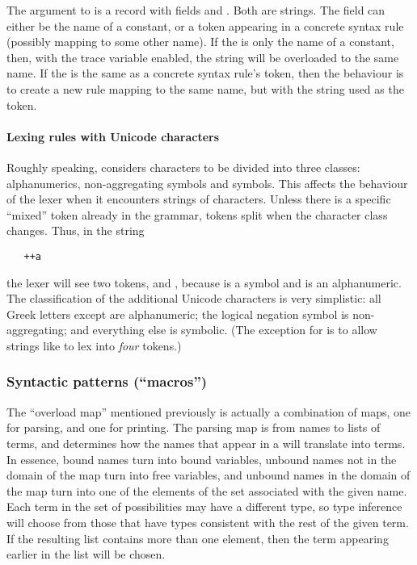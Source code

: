 The argument to  is a record with fields 
and .  Both are strings.  The  field can either be
the name of a constant, or a token appearing in a concrete syntax rule
(possibly mapping to some other name).  If the  is only the
name of a constant, then, with the trace variable enabled, the string
 will be overloaded to the same name.  If the  is the
same as a concrete syntax rule's token, then the behaviour is to
create a new rule mapping to the same name, but with the string 
used as the token.

\paragraph{Lexing rules with Unicode characters}
%
%
Roughly speaking, \HOL{} considers characters to be divided into three
classes: alphanumerics, non-aggregating symbols and symbols.  This
affects the behaviour of the lexer when it encounters strings of
characters.  Unless there is a specific ``mixed'' token already in the
grammar, tokens split when the character class changes.  Thus, in the
string
\begin{verbatim}
   ++a
\end{verbatim}
the lexer will see two tokens, \holtxt{++} and , because
\holtxt{+} is a symbol and  is an alphanumeric.  The
classification of the additional Unicode characters is very
simplistic: all Greek letters except \holtxt{$\lambda$} are alphanumeric;
the logical negation symbol \holtxt{$\neg$} is non-aggregating; and
everything else is symbolic.  (The exception for \holtxt{$\lambda$} is to
allow strings like  to lex into \emph{four} tokens.)


\subsubsection{Syntactic patterns (``macros'')}
\label{sec:parser:syntactic-patterns}

The ``overload map'' mentioned previously is actually a combination of
maps, one for parsing, and one for printing.  The parsing map is from
names to lists of terms, and determines how the names that appear in a
 will translate into terms.  In essence, bound names turn
into bound variables, unbound names not in the domain of the map turn
into free variables, and unbound names in the domain of the map turn
into one of the elements of the set associated with the given name.
Each term in the set of possibilities may have a different type, so
type inference will choose from those that have types consistent with
the rest of the given term.  If the resulting list contains more than
one element, then the term appearing earlier in the list will be
chosen.

